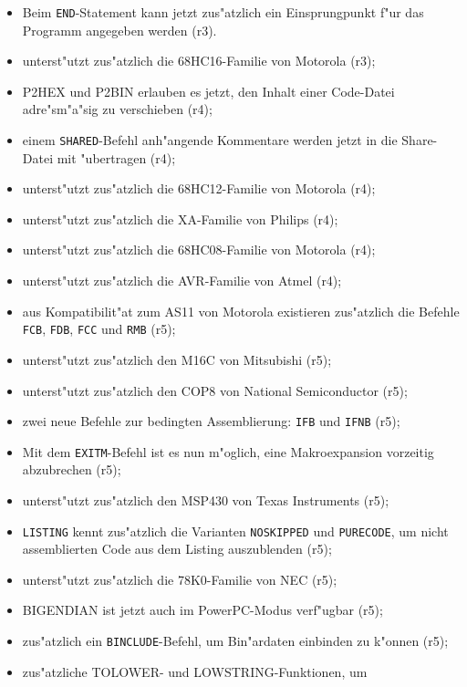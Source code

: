 \documentclass[12pt,a4paper,twoside]{report}
\newcommand{\tty}[1]{{\tt #1}}
\begin{document}
\begin{itemize}
{\begin{itemize}
{            ausgegeben werden (r3);}
      \item{Beim \tty{END}-Statement kann jetzt zus"atzlich ein
            Einsprungpunkt f"ur das Programm angegeben werden (r3).}
      \item{unterst"utzt zus"atzlich die 68HC16-Familie von Motorola (r3);}
      \item{P2HEX und P2BIN erlauben es jetzt, den Inhalt einer Code-Datei
            adre"sm"a"sig zu verschieben (r4);}
      \item{einem \tty{SHARED}-Befehl anh"angende Kommentare werden jetzt
            in die Share-Datei mit "ubertragen (r4);}
      \item{unterst"utzt zus"atzlich die 68HC12-Familie von Motorola (r4);}
      \item{unterst"utzt zus"atzlich die XA-Familie von Philips (r4);}
      \item{unterst"utzt zus"atzlich die 68HC08-Familie von Motorola (r4);}
      \item{unterst"utzt zus"atzlich die AVR-Familie von Atmel (r4);}
      \item{aus Kompatibilit"at zum AS11 von Motorola existieren zus"atzlich
            die Befehle \tty{FCB}, \tty{FDB}, \tty{FCC} und \tty{RMB} (r5);}
      \item{unterst"utzt zus"atzlich den M16C von Mitsubishi (r5);}
      \item{unterst"utzt zus"atzlich den COP8 von National Semiconductor
            (r5);}
      \item{zwei neue Befehle zur bedingten Assemblierung: \tty{IFB} und
            \tty{IFNB} (r5);}
      \item{Mit dem \tty{EXITM}-Befehl ist es nun m"oglich, eine
            Makroexpansion vorzeitig abzubrechen (r5);}
      \item{unterst"utzt zus"atzlich den MSP430 von Texas Instruments
            (r5);}
      \item{\tty{LISTING} kennt zus"atzlich die Varianten
            \tty{NOSKIPPED} und \tty{PURECODE}, um nicht assemblierten
            Code aus dem Listing auszublenden (r5);}
      \item{unterst"utzt zus"atzlich die 78K0-Familie von NEC (r5);}
      \item{BIGENDIAN ist jetzt auch im PowerPC-Modus verf"ugbar (r5);}
      \item{zus"atzlich ein \tty{BINCLUDE}-Befehl, um Bin"ardaten
            einbinden zu k"onnen (r5);}
      \item{zus"atzliche TOLOWER- und LOWSTRING-Funktionen, um
}
\end{itemize}}
\end{itemize}
\end{document}
